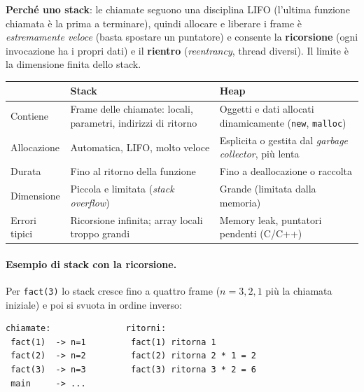 \textbf{Perché uno stack}: le chiamate seguono una disciplina LIFO (l'ultima funzione chiamata è la prima a terminare), quindi allocare e liberare i frame è \emph{estremamente veloce} (basta spostare un puntatore) e consente la \textbf{ricorsione} (ogni invocazione ha i propri dati) e il \textbf{rientro} (\emph{reentrancy}, thread diversi). Il limite è la dimensione finita dello stack.

\begin{center}
\small
\begin{tabularx}{\textwidth}{@{}>{\raggedright\arraybackslash}p{2.6cm}XX@{}}
\toprule
 & \textbf{Stack} & \textbf{Heap} \\
\midrule
Contiene & Frame delle chiamate: locali, parametri, indirizzi di ritorno & Oggetti e dati allocati dinamicamente (\texttt{new}, \texttt{malloc}) \\
Allocazione & Automatica, LIFO, molto veloce & Esplicita o gestita dal \emph{garbage collector}, più lenta \\
Durata & Fino al ritorno della funzione & Fino a deallocazione o raccolta \\
Dimensione & Piccola e limitata (\emph{stack overflow}) & Grande (limitata dalla memoria) \\
Errori tipici & Ricorsione infinita; array locali troppo grandi & Memory leak, puntatori pendenti (C/C++) \\
\bottomrule
\end{tabularx}
\end{center}

\paragraph{Esempio di stack con la ricorsione.} Per \texttt{fact(3)} lo stack cresce fino a quattro frame ($n=3,2,1$ più la chiamata iniziale) e poi si svuota in ordine inverso:

\begin{lstlisting}[numbers=none, caption={Evoluzione dello stack per fact(3)}]
chiamate:               ritorni:
 fact(1)  -> n=1         fact(1) ritorna 1
 fact(2)  -> n=2         fact(2) ritorna 2 * 1 = 2
 fact(3)  -> n=3         fact(3) ritorna 3 * 2 = 6
 main     -> ...
\end{lstlisting}


